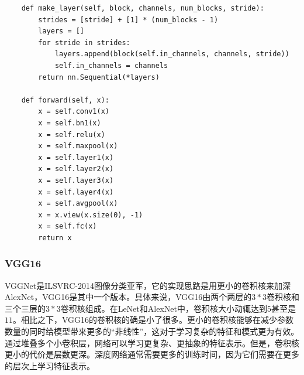 \documentclass{article}
\begin{document}
\begin{lstlisting}
    def make_layer(self, block, channels, num_blocks, stride):
        strides = [stride] + [1] * (num_blocks - 1)
        layers = []
        for stride in strides:
            layers.append(block(self.in_channels, channels, stride))
            self.in_channels = channels
        return nn.Sequential(*layers)

    def forward(self, x):
        x = self.conv1(x)
        x = self.bn1(x)
        x = self.relu(x)
        x = self.maxpool(x)
        x = self.layer1(x)
        x = self.layer2(x)
        x = self.layer3(x)
        x = self.layer4(x)
        x = self.avgpool(x)
        x = x.view(x.size(0), -1)
        x = self.fc(x)
        return x
\end{lstlisting}

\subsubsection{VGG16}
VGGNet是ILSVRC-2014图像分类亚军，它的实现思路是用更小的卷积核来加深AlexNet，VGG16是其中一个版本。具体来说，VGG16由两个两层的$3*3$卷积核和三个三层的$3*3$卷积核组成。在LeNet和AlexNet中，卷积核大小动辄达到$5$甚至是$11$。相比之下，VGG16的卷积核的确是小了很多。更小的卷积核能够在减少参数数量的同时给模型带来更多的“非线性”，这对于学习复杂的特征和模式更为有效。通过堆叠多个小卷积层，网络可以学习更复杂、更抽象的特征表示。但是，卷积核更小的代价是层数更深。深度网络通常需要更多的训练时间，因为它们需要在更多的层次上学习特征表示。
\end{document}
